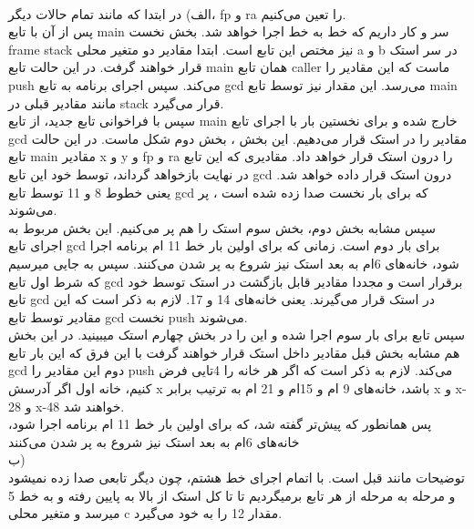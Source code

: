 
\\

الف)
در ابتدا که مانند تمام حالات دیگر، fp
و ra
را تعین می‌کنیم.
\\
پس از آن با تابع
main
سر و کار داریم که خط به خط اجرا خواهد شد. بخش نخست
frame
stack
نیز مختص این تابع است.
ابتدا مقادیر دو متغیر محلی
a
و
b
 در سر استک قرار خواهند گرفت. در این حالت تابع main
 همان تابع caller
 ماست که این مقادیر را push
 می‌کند.
 سپس اجرای برنامه به تابع gcd
 می‌رسد.
 این مقدار نیز توسط تابع main
 مانند مقادیر قبلی در stack
 قرار می‌گیرد.
 \\
 سپس با فراخوانی تابع جدید، از تابع main خارج شده
 و برای نخستین بار با اجرای تابع gcd
 مقادیر را در استک قرار می‌دهیم.
 این بخش ، بخش دوم شکل ماست.
 در این حالت تابع main
 مقادیر x
 و
 y
 و
 fp
 و
 ra
 را درون استک قرار خواهد داد.
مقادیری که این تابع در نهایت بازخواهد گرداند، توسط خود این تابع
gcd
درون استک قرار داده خواهد شد.
یعنی خطوط 8 و 11 توسط تابع gcd
که برای بار نخست صدا زده شده است ، پر می‌شوند.
\\
سپس مشابه بخش دوم، بخش سوم استک را هم پر می‌کنیم.
این بخش مربوط به اجرای تابع
gcd
برای بار دوم است.
زمانی که برای اولین بار خط 11 ام برنامه اجرا شود،
خانه‌های 6ام به بعد استک نیز شروع به پر شدن می‌کنند.
سپس به جایی میرسیم که شرط اول تابع
gcd
برقرار است و مجددا مقادیر قابل بازگشت در استک توسط خود تابع
gcd
در استک قرار می‌گیرند. یعنی خانه‌های 14 و 17.
لازم به ذکر است که این مقادیر توسط تابع gcd
نخست push می‌شوند.
\\
سپس تابع برای بار سوم اجرا شده و این را در بخش چهارم استک میبینید.
در این بخش هم
مشابه بخش قبل مقادیر داخل استک قرار خواهند گرفت با این فرق که این بار تابع
gcd
دوم
این مقادیر را push
می‌کند.
لازم به ذکر است که اگر هر خانه را 4تایی فرض کنیم،
خانه اول اگر آدرسش x
باشد،
خانه‌های 9 ام و 15ام و 21 ام به ترتیب برابر
x
و
x-28
و
x-48
خواهند شد.
\\
پس همانطور که پیش‌تر گفته شد،
که برای اولین بار خط 11 ام برنامه اجرا شود،
خانه‌های 6ام به بعد استک نیز شروع به پر شدن می‌کنند
\\
ب)
\\
توضیحات مانند قبل است.
با اتمام اجرای خط هشتم،
چون دیگر تابعی صدا زده نمیشود و مرحله به مرحله از هر تابع برمیگردیم تا تا کل استک از بالا به پایین
رفته و به خط 5 میرسد و متغیر محلی
c
مقدار 12 را به خود می‌گیرد.
\graphicspath{{./images/}}
